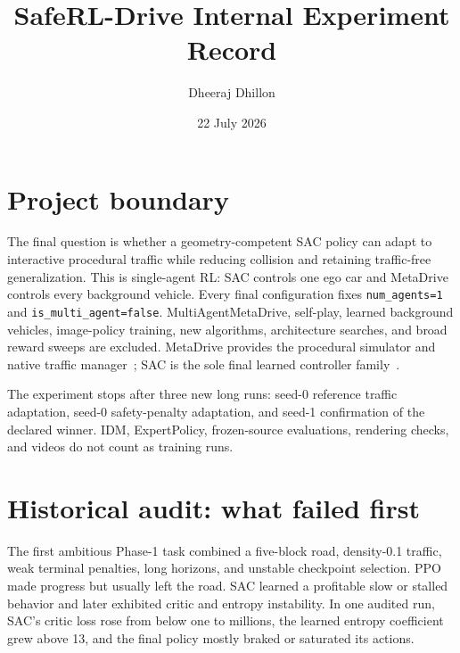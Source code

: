 \documentclass[10pt,twocolumn]{article}
\title{\vspace{-1.3em}\textbf{SafeRL-Drive Internal Experiment Record}\vspace{-0.5em}}
\author{Dheeraj Dhillon}
\date{22 July 2026}
\begin{document}

\section{Project boundary}
The final question is whether a geometry-competent SAC policy can adapt to interactive
procedural traffic while reducing collision and retaining traffic-free generalization.
This is single-agent RL: SAC controls one ego car and MetaDrive controls every background
vehicle. Every final configuration fixes \texttt{num\_agents=1} and
\texttt{is\_multi\_agent=false}. MultiAgentMetaDrive, self-play, learned background
vehicles, image-policy training, new algorithms, architecture searches, and broad reward
sweeps are excluded. MetaDrive provides the procedural simulator and native traffic
manager~\cite{li2022metadrive}; SAC is the sole final learned controller
family~\cite{haarnoja2018sac}.

The experiment stops after three new long runs: seed-0 reference traffic adaptation,
seed-0 safety-penalty adaptation, and seed-1 confirmation of the declared winner. IDM,
ExpertPolicy, frozen-source evaluations, rendering checks, and videos do not count as
training runs.

\section{Historical audit: what failed first}
The first ambitious Phase-1 task combined a five-block road, density-0.1 traffic, weak
terminal penalties, long horizons, and unstable checkpoint selection. PPO made progress
but usually left the road. SAC learned a profitable slow or stalled behavior and later
exhibited critic and entropy instability. In one audited run, SAC's critic loss rose from
below one to millions, the learned entropy coefficient grew above 13, and the final policy
mostly braked or saturated its actions.
\end{document}
